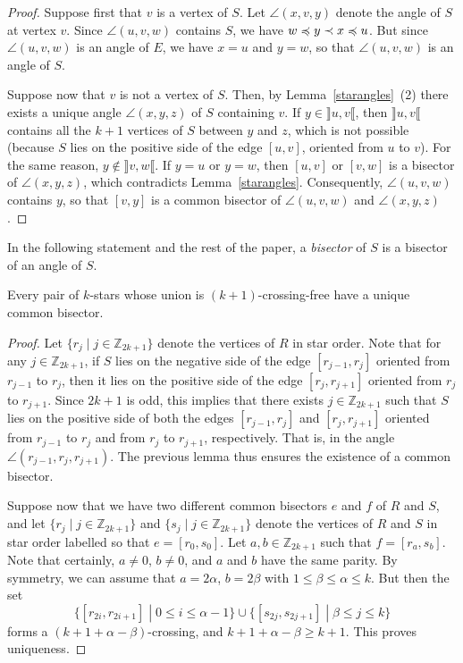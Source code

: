 \documentclass[12pt]{amsart}
\begin{document}
\begin{proof}
Suppose first that $v$ is a vertex of $S$. Let $\angle(x,v,y)$ denote the angle of $S$ at vertex $v$. Since $\angle(u,v,w)$ contains $S$, we have $w\preccurlyeq y\prec x\preccurlyeq u$. But since $\angle(u,v,w)$ is an angle of $E$, we have $x=u$ and $y=w$, so that $\angle(u,v,w)$ is an angle of $S$.

Suppose now that $v$ is not a vertex of $S$. Then, by Lemma~\ref{starangles}~(2)
there exists a unique angle $\angle(x,y,z)$ of $S$ containing $v$. If $y\in\rrbracket u,v\llbracket$, then $\rrbracket u,v\llbracket$ contains all the $k+1$ vertices of $S$ between $y$ and $z$, which is not possible (because $S$ lies on the positive side of the edge $[u,v]$, oriented from $u$ to $v$). For the same reason, $y\not\in \rrbracket v,w \llbracket$.
If $y=u$ or $y=w$, then $[u,v]$ or $[v,w]$ is a bisector of $\angle(x,y,z)$, which contradicts Lemma~\ref{starangles}. 
Consequently, $\angle(u,v,w)$ contains $y$, so that $[v,y]$ is a common bisector of $\angle(u,v,w)$ and $\angle(x,y,z)$.
\end{proof}

In the following statement and the rest of the paper, a \emph{bisector} of $S$ is a bisector of an angle of $S$.

\begin{theorem}\label{common bisector}
Every pair of $k$-stars whose union is $(k+1)$-crossing-free have a unique common bisector.
\end{theorem}

\begin{proof}
Let $\{r_j\;|\; j\in\mathbb{Z}_{2k+1}\}$ denote the vertices of $R$ in star order. Note that for any $j\in\mathbb{Z}_{2k+1}$, if $S$ lies on the negative side of the edge $[r_{j-1},r_j]$ oriented from $r_{j-1}$ to $r_j$, then it lies on the positive side of the edge $[r_j,r_{j+1}]$ oriented from $r_j$ to $r_{j+1}$. Since $2k+1$ is odd, this implies that there exists $j\in\mathbb{Z}_{2k+1}$ such that $S$ lies on the positive side of both the edges $[r_{j-1},r_j]$ and $[r_j,r_{j+1}]$ oriented from $r_{j-1}$ to $r_j$ and from $r_j$ to $r_{j+1}$, respectively. That is, in the angle $\angle(r_{j-1},r_j,r_{j+1})$. The previous lemma thus ensures the existence of a common bisector.

Suppose now that we have two different common bisectors $e$ and $f$ of $R$ and $S$, and let $\{r_j\;|\; j\in\mathbb{Z}_{2k+1}\}$ and $\{s_j\;|\; j\in\mathbb{Z}_{2k+1}\}$ denote the vertices of $R$ and $S$ in star order labelled so that $e=[r_0,s_0]$. Let $a,b\in\mathbb{Z}_{2k+1}$ such that $f=[r_a,s_b]$.
Note that certainly, $a\ne0$, $b\ne0$, and $a$ and $b$ have the same parity. By symmetry, we can assume that $a=2\alpha$, $b=2\beta$ with $1\le\beta\le\alpha\le k$. But then the set
$$\{[r_{2i},r_{2i+1}]\;|\; 0\le i\le \alpha-1\}\cup\{[s_{2j},s_{2j+1}]\;|\; \beta\le j\le k\}$$
forms a $(k+1+\alpha-\beta)$-crossing, and $k+1+\alpha-\beta\ge k+1$. This proves uniqueness.\end{proof}
\end{document}
